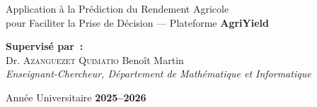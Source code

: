 \begin{center}
\begin{tcolorbox}[enhanced, colback=green!8, colframe=maingreen,
  fontupper=\normalsize\itshape, width=0.85\linewidth, center]
Application à la Prédiction du Rendement Agricole\\
pour Faciliter la Prise de Décision --- Plateforme \textbf{AgriYield}
\end{tcolorbox}

\vspace{1.5cm}

\large\textbf{Supervisé par~:}\\[0.3cm]
\large Dr. \textsc{Azanguezet Quimatio} Benoît Martin\\
\normalsize\textit{Enseignant-Chercheur, Département de Mathématique et Informatique}

\vfill

\large Année Universitaire \textbf{2025--2026}

\end{center}

\newpage
